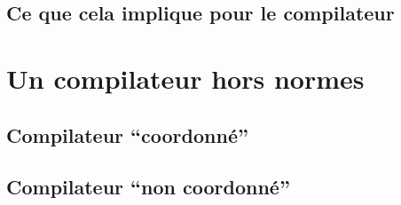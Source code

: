\documentclass[]{beamer}
\begin{document}
\subsection{Ce que cela implique pour le compilateur}
\begin{frame}
\end{frame}



\section{Un compilateur hors normes}

\subsection{Compilateur ``coordonné''}
\begin{frame}
\end{frame}

\subsection{Compilateur ``non coordonné''}
\begin{frame}
\end{frame}
\end{document}

